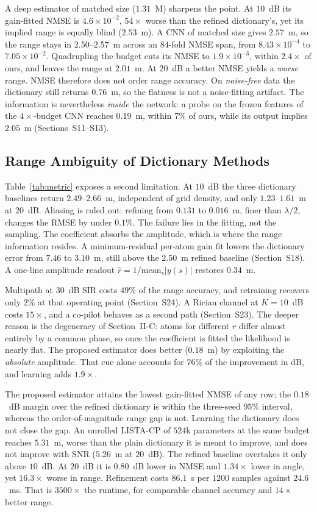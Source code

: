 \documentclass[journal]{IEEEtran}
\begin{document}
A deep estimator of matched size ($1.31$~M) sharpens the point. At $10$~dB its gain-fitted NMSE is $4.6\times10^{-2}$, $54\times$ worse than the refined dictionary's, yet its implied range is equally blind ($2.53$~m). A CNN of matched size gives $2.57$~m, so the range stays in $2.50$--$2.57$~m across an $84$-fold NMSE span, from $8.43\times10^{-4}$ to $7.05\times10^{-2}$. Quadrupling the budget cuts its NMSE to $1.9\times10^{-3}$, within $2.4\times$ of ours, and leaves the range at $2.01$~m. At $20$~dB a better NMSE yields a \emph{worse} range. NMSE therefore does not order range accuracy. On \emph{noise-free} data the dictionary still returns $0.76$~m, so the flatness is not a noise-fitting artifact. The information is nevertheless \emph{inside} the network: a probe on the frozen features of the $4\times$-budget CNN reaches $0.19$~m, within $7\%$ of ours, while its output implies $2.05$~m (Sections~S11--S13).
\subsection{Range Ambiguity of Dictionary Methods}

Table~\ref{tab:metric} exposes a second limitation. At $10$~dB the three dictionary baselines return $2.49$--$2.66$~m, independent of grid density, and only $1.23$--$1.61$~m at $20$~dB. Aliasing is ruled out: refining from $0.131$ to $0.016$~m, finer than $\lambda/2$, changes the RMSE by under $0.1\%$. The failure lies in the fitting, not the sampling. The coefficient absorbs the amplitude, which is where the range information resides. A minimum-residual per-atom gain fit lowers the dictionary error from $7.46$ to $3.10$~m, still above the $2.50$~m refined baseline (Section~S18). A one-line amplitude readout $\hat r = 1/\mathrm{mean}_s|y(s)|$ restores $0.34$~m.

Multipath at $30$~dB SIR costs $49\%$ of the range accuracy, and retraining recovers only $2\%$ at that operating point (Section~S24). A Rician channel at $K=10$~dB costs $15\times$, and a co-pilot behaves as a second path (Section~S23). The deeper reason is the degeneracy of Section~II-C: atoms for different $r$ differ almost entirely by a common phase, so once the coefficient is fitted the likelihood is nearly flat. The proposed estimator does better ($0.18$~m) by exploiting the \emph{absolute} amplitude. That cue alone accounts for $76\%$ of the improvement in dB, and learning adds $1.9\times$.

The proposed estimator attains the lowest gain-fitted NMSE of any row; the $0.18$~dB margin over the refined dictionary is within the three-seed $95\%$ interval, whereas the order-of-magnitude range gap is not. Learning the dictionary does not close the gap. An unrolled LISTA-CP of $524$k parameters at the same budget reaches $5.31$~m, worse than the plain dictionary it is meant to improve, and does not improve with SNR ($5.26$~m at $20$~dB). The refined baseline overtakes it only above $10$~dB. At $20$~dB it is $0.80$~dB lower in NMSE and $1.34\times$ lower in angle, yet $16.3\times$ worse in range. Refinement costs $86.1$~s per $1200$ samples against $24.6$~ms. That is $3500\times$ the runtime, for comparable channel accuracy and $14\times$ better range.
\end{document}
